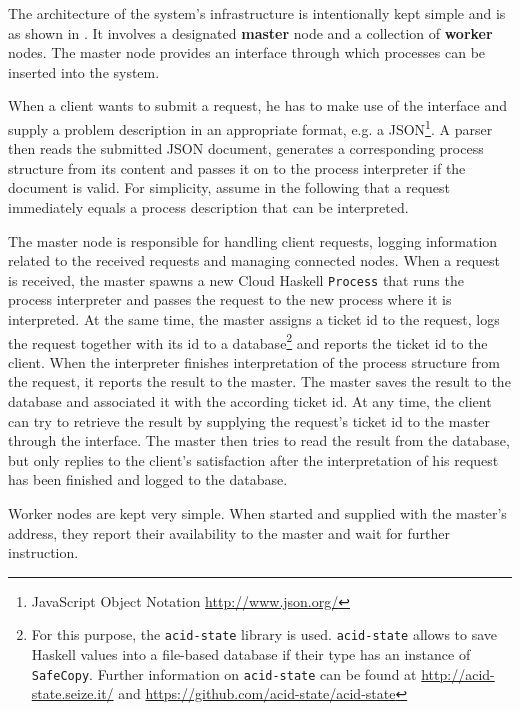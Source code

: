 The architecture of the system's infrastructure is intentionally kept simple and is as shown in . It involves a designated \textbf{master} node and a collection of \textbf{worker} nodes. The master node provides an interface through which processes can be inserted into the system.

When a client wants to submit a request, he has to make use of the interface and supply a problem description in an appropriate format, e.g. a JSON\footnote{JavaScript Object Notation \url{http://www.json.org/}}. A parser then reads the submitted JSON document, generates a corresponding process structure from its content and passes it on to the process interpreter if the document is valid. For simplicity, assume in the following that a request immediately equals a process description that can be interpreted.

The master node is responsible for handling client requests, logging information related to the received requests and managing connected nodes. When a request is received, the master spawns a new \textsf{Cloud Haskell} \texttt{Process} that runs the process interpreter and passes the request to the new process where it is interpreted. At the same time, the master assigns a ticket id to the request, logs the request together with its id to a database\footnote{For this purpose, the \texttt{acid-state} library is used. \texttt{acid-state} allows to save \textsf{Haskell} values into a file-based database if their type has an instance of \texttt{SafeCopy}. Further information on \texttt{acid-state} can be found at \url{http://acid-state.seize.it/} and \url{https://github.com/acid-state/acid-state}} and reports the ticket id to the client. When the interpreter finishes interpretation of the process structure from the request, it reports the result to the master. The master saves the result to the database and associated it with the according ticket id. At any time, the client can try to retrieve the result by supplying the request's ticket id to the master through the interface. The master then tries to read the result from the database, but only replies to the client's satisfaction after the interpretation of his request has been finished and logged to the database.

Worker nodes are kept very simple. When started and supplied with the master's address, they report their availability to the master and wait for further instruction.

